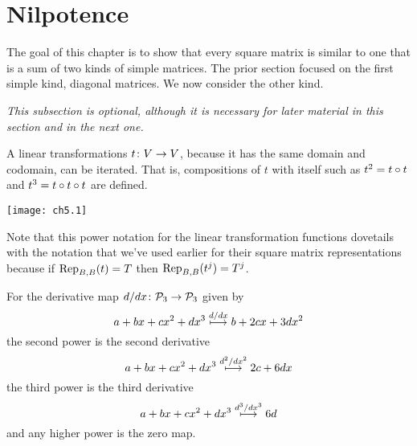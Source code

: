 \section{Nilpotence}
The goal of this chapter is to show that every square matrix is similar to one
that is a sum of two kinds of simple matrices.
The prior section
focused on the first simple kind, diagonal matrices.
We now consider the other kind.









%
\noindent\textit{This subsection is optional, although it is necessary
for later material in this section and in the next one.}

A linear transformations $\map{t}{V}{V}$, because it has the same domain and
codomain, can be iterated. %
That is, compositions of $t$ with itself such as \( t^2=\composed{t}{t} \) 
and \( t^3=\composed{t}{\composed{t}{t}} \) are defined.
\begin{center}
  \texttt{[image: ch5.1]}
\end{center}
Note that this
power notation for the linear transformation functions dovetails with 
the notation that we've used earlier for their square matrix representations
because if $\rep{t}{B,B}=T$ then \( \rep{t^j}{B,B}=T^j \).


\begin{example} \label{ex:DerivIter}
For the derivative map \( \map{d/dx}{\polyspace_3}{\polyspace_3} \)
given by 
\begin{equation*}
  a+bx+cx^2+dx^3\mapsunder{d/dx} b+2cx+3dx^2
\end{equation*}
the second power is the second derivative
\begin{equation*}
  a+bx+cx^2+dx^3\mapsunder{d^2/dx^2} 2c+6dx 
\end{equation*}
the third power is the third derivative
\begin{equation*}
  a+bx+cx^2+dx^3\mapsunder{d^3/dx^3} 6d 
\end{equation*}
and any higher power is the zero map.
\end{example}

